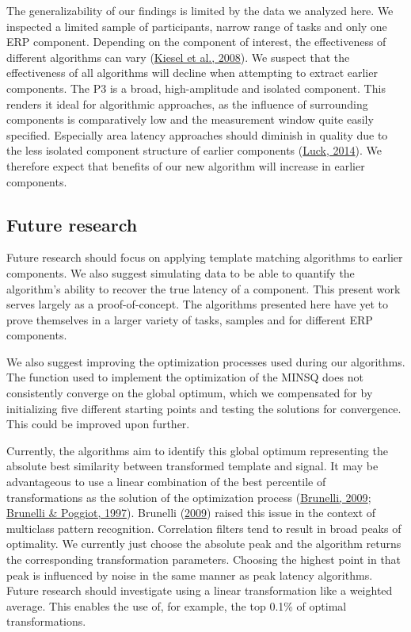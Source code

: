 \documentclass[
  man]{apa7}
\begin{document}
The generalizability of our findings is limited by the data we analyzed here. We inspected a limited sample of participants, narrow range of tasks and only one ERP component. Depending on the component of interest, the effectiveness of different algorithms can vary (\protect\hyperlink{ref-kiesel2008measurement}{Kiesel et al., 2008}). We suspect that the effectiveness of all algorithms will decline when attempting to extract earlier components. The P3 is a broad, high-amplitude and isolated component. This renders it ideal for algorithmic approaches, as the influence of surrounding components is comparatively low and the measurement window quite easily specified. Especially area latency approaches should diminish in quality due to the less isolated component structure of earlier components (\protect\hyperlink{ref-luck2014introduction}{Luck, 2014}). We therefore expect that benefits of our new algorithm will increase in earlier components.

\hypertarget{future-research}{%
\subsection{Future research}\label{future-research}}

Future research should focus on applying template matching algorithms to earlier components. We also suggest simulating data to be able to quantify the algorithm's ability to recover the true latency of a component. This present work serves largely as a proof-of-concept. The algorithms presented here have yet to prove themselves in a larger variety of tasks, samples and for different ERP components.

We also suggest improving the optimization processes used during our algorithms. The function used to implement the optimization of the MINSQ does not consistently converge on the global optimum, which we compensated for by initializing five different starting points and testing the solutions for convergence. This could be improved upon further.

Currently, the algorithms aim to identify this global optimum representing the absolute best similarity between transformed template and signal. It may be advantageous to use a linear combination of the best percentile of transformations as the solution of the optimization process (\protect\hyperlink{ref-brunelli2009template}{Brunelli, 2009}; \protect\hyperlink{ref-brunelli1997template}{Brunelli \& Poggiot, 1997}). Brunelli (\protect\hyperlink{ref-brunelli2009template}{2009}) raised this issue in the context of multiclass pattern recognition. Correlation filters tend to result in broad peaks of optimality. We currently just choose the absolute peak and the algorithm returns the corresponding transformation parameters. Choosing the highest point in that peak is influenced by noise in the same manner as peak latency algorithms. Future research should investigate using a linear transformation like a weighted average. This enables the use of, for example, the top 0.1\% of optimal transformations.
\end{document}
